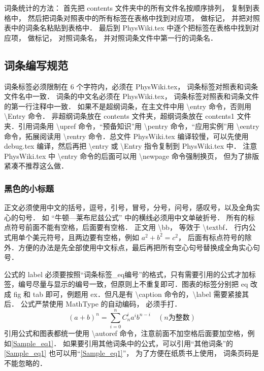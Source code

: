 词条统计的方法： 首先把 contents 文件夹中的所有文件名按顺序排列， 复制到表格中， 然后把词条对照表中的所有标签在表格中找到对应项， 做标记， 并把对照表中的词条名粘贴到表格中． 最后到 PhysWiki.tex 中逐个把标签在表格中找到对应项， 做标记， 对照词条名， 并对照词条文件中第一行的词条名．

\subsection{词条编写规范}

词条标签必须限制在 6 个字符内，必须在 PhysWiki.tex， 词条标签对照表和词条文件名中一致． 词条的中文名必须在 PhysWiki.tex， 词条标签对照表和词条文件的第一行注释中一致． 如果不是超纲词条，在主文件中用 \textbackslash entry 命令，否则用 \textbackslash Entry 命令． 非超纲词条放在 contents 文件夹，超纲词条放在 contents1 文件夹．引用词条用 \textbackslash upref 命令，“预备知识”用 \textbackslash pentry 命令，“应用实例”用 \textbackslash eentry 命令，拓展阅读用 \textbackslash rentry 命令．总文件 PhysWiki.tex 编译较慢，可以先使用 debug.tex 编译，然后再把 \textbackslash entry 或 \textbackslash Entry 指令复制到 PhysWiki.tex 中． 注意 PhysWiki.tex 中 \textbackslash entry 命令的后面可以用 \textbackslash newpage 命令强制换页， 但为了排版紧凑不推荐这么做．

\subsubsection{黑色的小标题}

正文必须使用中文的括号，逗号，引号，冒号，分号，问号，感叹号，以及全角实心的句号． 如 “牛顿—莱布尼兹公式” 中的横线必须用中文单破折号． 所有的标点符号前面不能有空格，后面要有空格． 正文用 \textbackslash bb， 等效于 \textbackslash textbf． 行内公式用单个美元符号，且两边要有空格，例如 $a^2+b^2=c^2$， 后面有标点符号的除外．方便的办法是先全部使用中文标点，最后再把所有空心句号替换成全角实心句号．

公式的 label 必须要按照“词条标签\_eq编号”的格式，只有需要引用的公式才加标签，编号尽量与显示的编号一致，但原则上不重复即可．图表的标签分别把 eq 改成 fig 和 tab 即可，例题用 ex．但凡是有 \textbackslash caption 命令的，\textbackslash label 需要紧接其后． 公式严禁使用 MathType 的自动编码， 必须手打．
\begin{equation}\label{Sample_eq1}
(a+b)^n = \sum_{i=0}^n C_n^i a^i b^{n-i} \quad (n\text{为整数})
\end{equation}
引用公式和图表都统一使用 \textbackslash autoref 命令，注意前面不加空格后面要加空格，例如\autoref{Sample_eq1}． 如果要引用其他词条中的公式，可以引用“其他词条”的\autoref{Sample_eq1} 也可以用“\autoref{Sample_eq1}”， 为了方便在纸质书上使用， 词条页码是不能忽略的．

